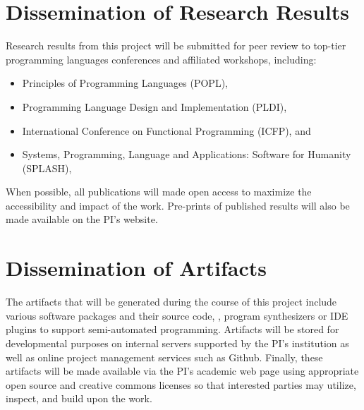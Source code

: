 \documentclass[11pt]{article}
\begin{document}
\startdoc{\shorttitle}

\section*{Dissemination of Research Results}
Research results from this project will be submitted for peer review to top-tier programming languages conferences and affiliated workshops, including:
\begin{itemize}[itemsep=0em]
  \item Principles of Programming Languages (POPL),
  \item Programming Language Design and Implementation (PLDI),
  \item International Conference on Functional Programming (ICFP), and
  \item Systems, Programming, Language and Applications: Software for Humanity (SPLASH),
\end{itemize}
When possible, all publications will made open access to maximize the accessibility and impact of the work.
Pre-prints of published results will also be made available on the PI's website.

\section*{Dissemination of Artifacts}
The artifacts that will be generated during the course of this project include various software packages and their source code, \eg, program synthesizers or IDE plugins to support semi-automated programming.
Artifacts will be stored for developmental purposes on internal servers supported by the PI's institution as well as online project management services such as Github.
Finally, these artifacts will be made available via the PI's academic web page using appropriate open source and creative commons licenses so that interested parties may utilize, inspect, and build upon the work.
\end{document}
